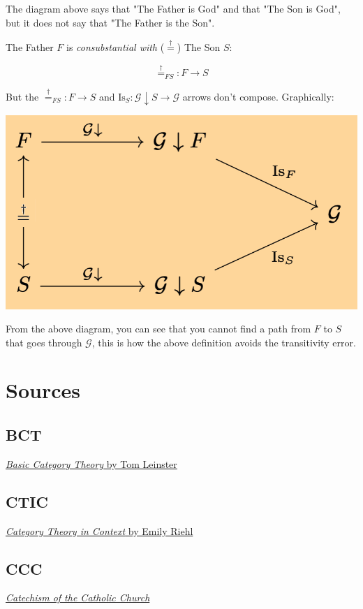 \documentclass[11pt]{article}
\begin{document}
The diagram above says that "The Father is God" and that "The Son is God", but it does not say that
"The Father is the Son".

The Father \(F\) is \emph{consubstantial with} (\(\stackrel{\dagger}{=}\)) The Son \(S\):

$$\stackrel{\dagger}{=}_{FS} : F \to S$$

But the \(\stackrel{\dagger}{=}_{FS} : F \to S\) and \(\text{Is}_S : \mathcal{G}\downarrow S \to \mathcal{G}\) arrows
don't compose. Graphically:

\begin{center}
\includegraphics[width=.9\linewidth]{./f-is-not-s.png}
\end{center}

From the above diagram, you can see that you cannot find a path from \(F\) to \(S\) that goes through \(\mathcal{G}\),
this is how the above definition avoids the transitivity error.
\section{Sources}
\label{sec:org717892e}
\subsection{BCT}
\label{sec:orge9d2214}
\href{https://arxiv.org/pdf/1612.09375\#page=18}{\emph{Basic Category Theory} by Tom Leinster}
\subsection{CTIC}
\label{sec:org4989c75}
\href{https://emilyriehl.github.io/files/context.pdf}{\emph{Category Theory in Context} by Emily Riehl}
\subsection{CCC}
\label{sec:org4ae31f1}
\href{https://www.vatican.va/archive/ENG0015/\_INDEX.HTM}{\emph{Catechism of the Catholic Church}}
\end{document}
